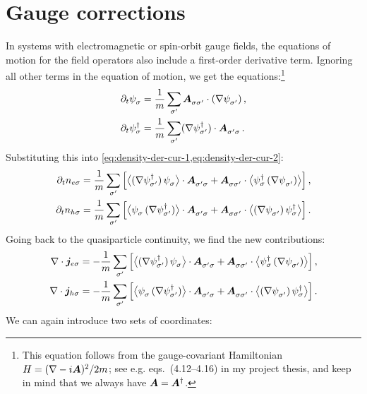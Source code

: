 \section{Gauge corrections}
In systems with electromagnetic or spin-orbit gauge fields, the equations of motion for the field operators also include a first-order derivative term.
Ignoring all other terms in the equation of motion, we get the equations:\footnote{This equation follows from the gauge-covariant Hamiltonian $H = (\nabla-i\bm{A})^2/2m$; see e.g. eqs.~(4.12--4.16) in my project thesis, and keep in mind that we always have $\bm{A} = \bm{A}^\dagger$.}
\begin{align}
  \p t \pc{\psi_\sigma} &= \frac{1}{m} \sum_{\sigma'} \pc{\B{A}_{\sigma\sigma'}} \cdot (\nabla \pc{\psi_{\sigma'}}) \,, \\
  \p t \hc{\psi_\sigma} &= \frac{1}{m} \sum_{\sigma'} (\nabla \hc{\psi_{\sigma'}}) \cdot \pc{\B{A}_{\sigma'\sigma}} \,.
\end{align}
Substituting this into \cref{eq:density-der-cur-1,eq:density-der-cur-2}:
\begin{align}
  \p t n_{e\sigma} &=
  \frac{1}{m} \sum_{\sigma'}
  \left[ 
    \avg[\big]{(\nabla \hc{\psi_{\sigma'}})\, \pc{\psi_{\sigma}}} \cdot \pc{\B{A}_{\sigma'\sigma}} +
    \pc{\B{A}_{\sigma\sigma'}} \cdot \avg[\big]{ \hc{\psi_{\sigma}}\, (\nabla \pc{\psi_{\sigma'}})}
  \right], \\
  \p t n_{h\sigma} &=
  \frac{1}{m} \sum_{\sigma'}
  \left[ 
    \avg[\big]{\pc{\psi_{\sigma}}\, (\nabla \hc{\psi_{\sigma'}})} \cdot \pc{\B{A}_{\sigma'\sigma}} +
    \pc{\B{A}_{\sigma\sigma'}} \cdot \avg[\big]{(\nabla \pc{\psi_{\sigma'}})\, \hc{\psi_{\sigma}}}
  \right]. 
\end{align}
Going back to the quasiparticle continuity, we find the new contributions:
\begin{align}
  \nabla \cdot \B{j}_{e\sigma} &=
  -\frac{1}{m} \sum_{\sigma'}
  \left[ 
    \avg[\big]{(\nabla \hc{\psi_{\sigma'}})\, \pc{\psi_{\sigma}}} \cdot \pc{\B{A}_{\sigma'\sigma}} +
    \pc{\B{A}_{\sigma\sigma'}} \cdot \avg[\big]{ \hc{\psi_{\sigma}}\, (\nabla \pc{\psi_{\sigma'}})}
  \right], \\
  \nabla \cdot \B{j}_{h\sigma} &=
  -\frac{1}{m} \sum_{\sigma'}
  \left[ 
    \avg[\big]{\pc{\psi_{\sigma}}\, (\nabla \hc{\psi_{\sigma'}})} \cdot \pc{\B{A}_{\sigma'\sigma}} +
    \pc{\B{A}_{\sigma\sigma'}} \cdot \avg[\big]{(\nabla \pc{\psi_{\sigma'}})\, \hc{\psi_{\sigma}}}
  \right]. 
\end{align}
We can again introduce two sets of coordinates:
